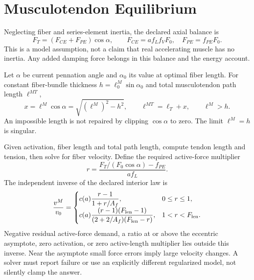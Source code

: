 \section{Musculotendon Equilibrium}

Neglecting fiber and series-element inertia, the declared axial balance is
\begin{equation}
 F_T=(F_{CE}+F_{PE})\cos\alpha,\qquad
 F_{CE}=a f_L f_V F_0,\quad F_{PE}=f_{PE}F_0.
 \label{eq:ch3:mt-equilibrium}
\end{equation}
This is a model assumption, not a claim that real accelerating muscle has no
inertia. Any added damping force belongs in this balance and the energy account.

Let $\alpha$ be current pennation angle and $\alpha_0$ its value at optimal
fiber length. For constant fiber-bundle thickness $h=\ell_0^M\sin\alpha_0$
and total musculotendon path length $\ell^{MT}$,
\begin{equation}
 x=\ell^M\cos\alpha=\sqrt{(\ell^M)^2-h^2},\qquad
 \ell^{MT}=\ell_T+x,\qquad \ell^M>h.
 \label{eq:ch3:mt-length}
\end{equation}
An impossible length is not repaired by clipping $\cos\alpha$ to zero.
The limit $\ell^M=h$ is singular.

\begin{center}
\end{center}

Given activation, fiber length and total path length, compute tendon length and
tension, then solve for fiber velocity. Define the required active-force multiplier
\[
 r=\frac{F_T/(F_0\cos\alpha)-f_{PE}}{a f_L}.
\]
The independent inverse of the declared interior law is
\begin{equation}
 \frac{v^M}{v_0}=
 \begin{cases}
 c(a)\dfrac{r-1}{1+r/A_f},&0\leq r\leq1,\\[3pt]
 c(a)\dfrac{(r-1)(F_{\rm len}-1)}
 {(2+2/A_f)(F_{\rm len}-r)},&1<r<F_{\rm len}.
 \end{cases}
 \label{eq:ch3:inverse-velocity}
\end{equation}
Negative residual active-force demand, a ratio at or above the eccentric
asymptote, zero activation, or zero active-length multiplier lies outside this
inverse. Near the asymptote small force errors imply large velocity changes.
A solver must report failure or use an explicitly different regularized model,
not silently clamp the answer.


